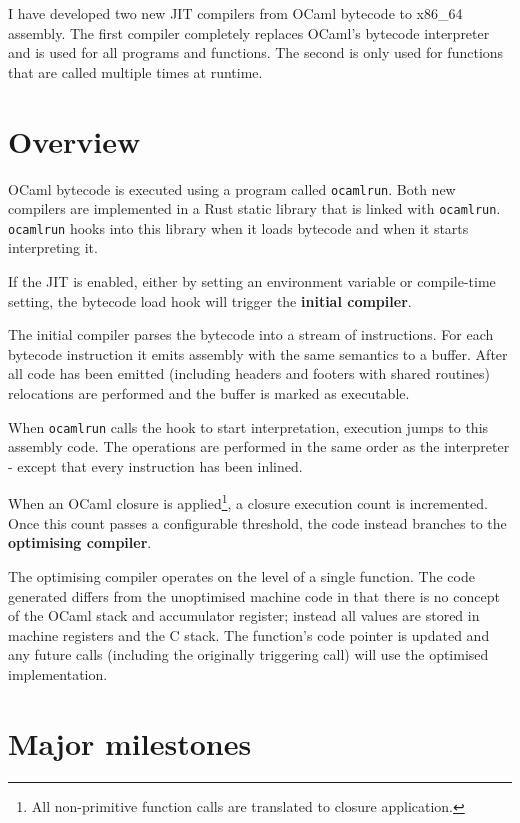 I have developed two new JIT compilers from OCaml bytecode to x86\_64 assembly. The first compiler
completely replaces OCaml's bytecode interpreter and
is used for all programs and functions. The second is only used for functions that are called
multiple times at runtime.

\section{Overview}

OCaml bytecode is executed using a program called \texttt{ocamlrun}. Both new compilers are
implemented in a Rust static library that is linked with \texttt{ocamlrun}. \texttt{ocamlrun}
hooks into
this library when it loads bytecode and when it starts interpreting it.

If the JIT is enabled, either by setting an environment variable or compile-time setting, the
bytecode load hook will trigger the \textbf{initial compiler}.

The initial compiler parses the bytecode into a stream of instructions. For each bytecode
instruction it emits assembly with the same semantics to a buffer. After all code has been emitted
(including headers and footers with shared routines) relocations are performed and the buffer is
marked as executable.

When \texttt{ocamlrun} calls the hook to start interpretation, execution jumps to
this assembly code. The operations are performed in the same order as the interpreter - except
that every
instruction has been inlined.

When an OCaml closure is applied\footnote{All non-primitive function calls are translated to
      closure application.}, a closure execution count is incremented. Once this count passes a
configurable
threshold, the code instead branches to the \textbf{optimising compiler}.

The optimising compiler operates on the level of a single function. The code generated differs from
the unoptimised machine code in that there is no concept of the OCaml stack and accumulator
register; instead all values are stored in machine registers and the C stack. The function's code
pointer is updated and any
future calls (including the originally triggering call) will use the optimised implementation.

\section{Major milestones}


